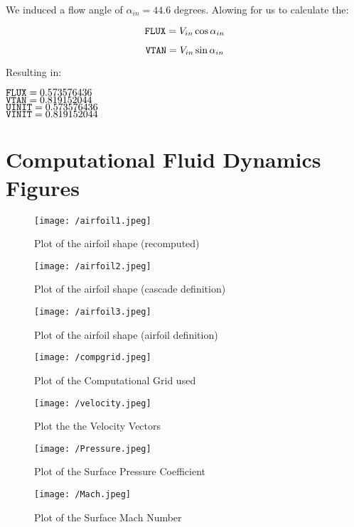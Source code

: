 \documentclass[12pt,english]{article}
\begin{document}
We induced a flow angle of $\alpha_{in} = 44.6$ degrees. 
Alowing for us to calculate the:

\begin{equation}
\label{eq:FLUX}
\verb|FLUX| = V_{in} \cos{\alpha_{in}}
\end{equation}

\begin{equation}
\label{eq:VTAN}
\verb|VTAN| = V_{in} \sin{\alpha_{in}}
\end{equation}

Resulting in:

\begin{center}
  $\verb|FLUX| = 0.573576436$ \\
  $\verb|VTAN| = 0.819152044$ \\
  $\verb|UINIT| = 0.573576436$ \\
  $\verb|VINIT| = 0.819152044$ \\
\end{center}

\section{Computational Fluid Dynamics Figures}

\begin{figure}[h]
  \centering
  \texttt{[image: /airfoil1.jpeg]}
  \caption{Plot of the airfoil shape (recomputed)}
  \label{fig:Airfoil1}
\end{figure}

\begin{figure}[h]
  \centering
  \texttt{[image: /airfoil2.jpeg]}
  \caption{Plot of the airfoil shape (cascade definition)}
  \label{fig:Airfoil2}

\end{figure}

\begin{figure}[h]
  \centering
  \texttt{[image: /airfoil3.jpeg]}
  \caption{Plot of the airfoil shape (airfoil definition)}
  \label{fig:Airfoil3}
\end{figure}


\begin{figure}[h]
  \centering
  \texttt{[image: /compgrid.jpeg]}
  \caption{Plot of the Computational Grid used}
  \label{fig:CompGrid}
\end{figure}

\begin{figure}[h]
  \centering
  \texttt{[image: /velocity.jpeg]}
  \caption{Plot the the Velocity Vectors}
  \label{fig:Vel Vectors}
\end{figure}

\begin{figure}[h]
  \centering
  \texttt{[image: /Pressure.jpeg]}
  \caption{Plot of the Surface Pressure Coefficient}
  \label{fig:Pressure Coef}
\end{figure}

\begin{figure}[h]
  \centering
  \texttt{[image: /Mach.jpeg]}
  \caption{Plot of the Surface Mach Number}
  \label{fig:Surf Mach}
\end{figure}
\end{document}
